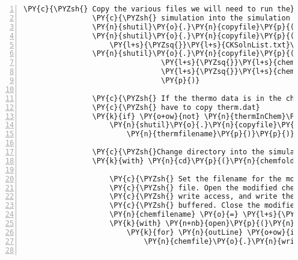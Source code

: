 \begin{Verbatim}[commandchars=\\\{\},fontsize=\small,numbers=left,firstnumber=1,stepnumber=2,firstline=2]
                \PY{c}{\PYZsh{} Copy the various files we will need to run the}
                \PY{c}{\PYZsh{} simulation into the simulation directory.}
                \PY{n}{shutil}\PY{o}{.}\PY{n}{copyfile}\PY{p}{(}\PY{n}{inpfile}\PY{p}{,} \PY{n}{os}\PY{o}{.}\PY{n}{path}\PY{o}{.}\PY{n}{join}\PY{p}{(}\PY{n}{chemfolder}\PY{p}{,} \PY{n}{inpfile}\PY{p}{)}\PY{p}{)}
                \PY{n}{shutil}\PY{o}{.}\PY{n}{copyfile}\PY{p}{(}\PY{l+s}{\PYZsq{}}\PY{l+s}{CKSolnList.txt}\PY{l+s}{\PYZsq{}}\PY{p}{,} \PY{n}{os}\PY{o}{.}\PY{n}{path}\PY{o}{.}\PY{n}{join}\PY{p}{(}\PY{n}{chemfolder}\PY{p}{,}
                    \PY{l+s}{\PYZsq{}}\PY{l+s}{CKSolnList.txt}\PY{l+s}{\PYZsq{}}\PY{p}{)}\PY{p}{)}
                \PY{n}{shutil}\PY{o}{.}\PY{n}{copyfile}\PY{p}{(}\PY{n}{os}\PY{o}{.}\PY{n}{path}\PY{o}{.}\PY{n}{join}\PY{p}{(}\PY{n}{reactiondir}\PY{p}{,} \PY{l+s}{\PYZsq{}}\PY{l+s}{data}\PY{l+s}{\PYZsq{}}\PY{p}{,}
                                \PY{l+s}{\PYZsq{}}\PY{l+s}{chemkindata.dtd}\PY{l+s}{\PYZsq{}}\PY{p}{)}\PY{p}{,} \PY{n}{os}\PY{o}{.}\PY{n}{path}\PY{o}{.}\PY{n}{join}\PY{p}{(}\PY{n}{chemfolder}\PY{p}{,}
                                \PY{l+s}{\PYZsq{}}\PY{l+s}{chemkindata.dtd}\PY{l+s}{\PYZsq{}}\PY{p}{)}
                                \PY{p}{)}

                \PY{c}{\PYZsh{} If the thermo data is in the chemistry file, we don\PYZsq{}t}
                \PY{c}{\PYZsh{} have to copy therm.dat}
                \PY{k}{if} \PY{o+ow}{not} \PY{n}{thermInChem}\PY{p}{:}
                    \PY{n}{shutil}\PY{o}{.}\PY{n}{copyfile}\PY{p}{(}\PY{n}{thermfilename}\PY{p}{,} \PY{n}{os}\PY{o}{.}\PY{n}{path}\PY{o}{.}\PY{n}{join}\PY{p}{(}\PY{n}{chemfolder}\PY{p}{,}
                        \PY{n}{thermfilename}\PY{p}{)}\PY{p}{)}

                \PY{c}{\PYZsh{}Change directory into the simulation directory.}
                \PY{k}{with} \PY{n}{cd}\PY{p}{(}\PY{n}{chemfolder}\PY{p}{)}\PY{p}{:}

                    \PY{c}{\PYZsh{} Set the filename for the modified chemistry input}
                    \PY{c}{\PYZsh{} file. Open the modified chemistry input file with}
                    \PY{c}{\PYZsh{} write access, and write the file. This write is}
                    \PY{c}{\PYZsh{} buffered. Close the modified chemistry input file.}
                    \PY{n}{chemfilename} \PY{o}{=} \PY{l+s}{\PYZsq{}}\PY{l+s}{chem}\PY{l+s}{\PYZsq{}} \PY{o}{+} \PY{n+nb}{str}\PY{p}{(}\PY{n}{rxnNum} \PY{o}{+} \PY{l+m+mi}{1}\PY{p}{)} \PY{o}{+} \PY{l+s}{\PYZsq{}}\PY{l+s}{.inp}\PY{l+s}{\PYZsq{}}
                    \PY{k}{with} \PY{n+nb}{open}\PY{p}{(}\PY{n}{chemfilename}\PY{p}{,} \PY{l+s}{\PYZsq{}}\PY{l+s}{wt}\PY{l+s}{\PYZsq{}}\PY{p}{)} \PY{k}{as} \PY{n}{chemfile}\PY{p}{:}
                        \PY{k}{for} \PY{n}{outLine} \PY{o+ow}{in} \PY{n}{outLines}\PY{p}{:}
                            \PY{n}{chemfile}\PY{o}{.}\PY{n}{write}\PY{p}{(}\PY{n}{outLine}\PY{p}{)}


\end{Verbatim}
